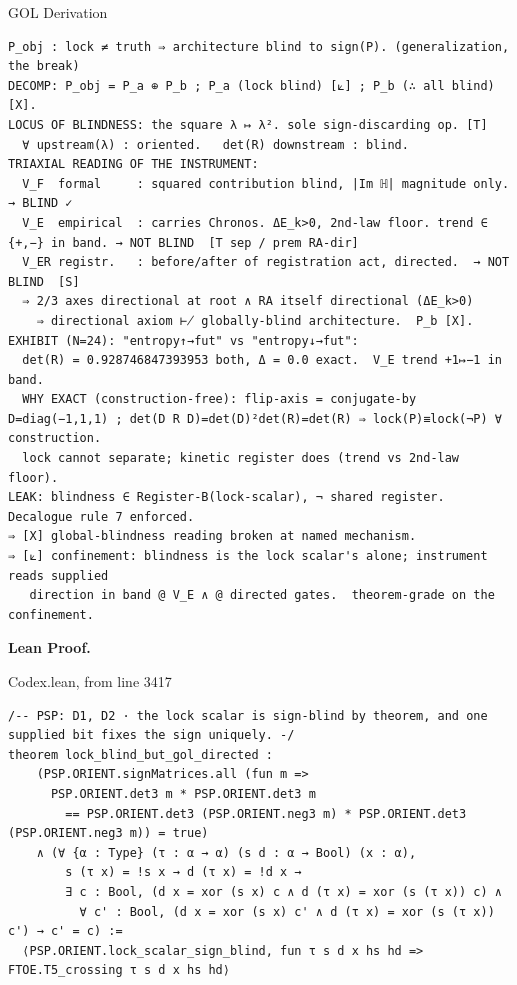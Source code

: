 \documentclass[10pt,twocolumn]{article}
\begin{document}
\begin{golbox}{GOL Derivation}
\begin{lstlisting}[style=golv]
P_obj : lock ≠ truth ⇒ architecture blind to sign(P). (generalization, the break)
DECOMP: P_obj = P_a ⊕ P_b ; P_a (lock blind) [⟀] ; P_b (∴ all blind) [X].
LOCUS OF BLINDNESS: the square λ ↦ λ². sole sign-discarding op. [T]
  ∀ upstream(λ) : oriented.   det(R) downstream : blind.
TRIAXIAL READING OF THE INSTRUMENT:
  V_F  formal     : squared contribution blind, |Im ℍ| magnitude only.  → BLIND ✓
  V_E  empirical  : carries Chronos. ΔE_k>0, 2nd-law floor. trend ∈ {+,−} in band. → NOT BLIND  [T sep / prem RA-dir]
  V_ER registr.   : before/after of registration act, directed.  → NOT BLIND  [S]
  ⇒ 2/3 axes directional at root ∧ RA itself directional (ΔE_k>0)
    ⇒ directional axiom ⊬ globally-blind architecture.  P_b [X].
EXHIBIT (N=24): "entropy↑→fut" vs "entropy↓→fut":
  det(R) = 0.928746847393953 both, Δ = 0.0 exact.  V_E trend +1↦−1 in band.
  WHY EXACT (construction-free): flip-axis = conjugate-by D=diag(−1,1,1) ; det(D R D)=det(D)²det(R)=det(R) ⇒ lock(P)≡lock(¬P) ∀ construction.
  lock cannot separate; kinetic register does (trend vs 2nd-law floor).
LEAK: blindness ∈ Register-B(lock-scalar), ¬ shared register. Decalogue rule 7 enforced.
⇒ [X] global-blindness reading broken at named mechanism.
⇒ [⟀] confinement: blindness is the lock scalar's alone; instrument reads supplied
   direction in band @ V_E ∧ @ directed gates.  theorem-grade on the confinement.
\end{lstlisting}
\end{golbox}

\textbf{Lean Proof.}

\begin{leanexcerpt}{Codex.lean, from line 3417}
\begin{lstlisting}[style=leanx,firstnumber=3417]
/-- PSP: D1, D2 · the lock scalar is sign-blind by theorem, and one supplied bit fixes the sign uniquely. -/
theorem lock_blind_but_gol_directed :
    (PSP.ORIENT.signMatrices.all (fun m =>
      PSP.ORIENT.det3 m * PSP.ORIENT.det3 m
        == PSP.ORIENT.det3 (PSP.ORIENT.neg3 m) * PSP.ORIENT.det3 (PSP.ORIENT.neg3 m)) = true)
    ∧ (∀ {α : Type} (τ : α → α) (s d : α → Bool) (x : α),
        s (τ x) = !s x → d (τ x) = !d x →
        ∃ c : Bool, (d x = xor (s x) c ∧ d (τ x) = xor (s (τ x)) c) ∧
          ∀ c' : Bool, (d x = xor (s x) c' ∧ d (τ x) = xor (s (τ x)) c') → c' = c) :=
  ⟨PSP.ORIENT.lock_scalar_sign_blind, fun τ s d x hs hd => FTOE.T5_crossing τ s d x hs hd⟩
\end{lstlisting}
\end{leanexcerpt}
\end{document}
